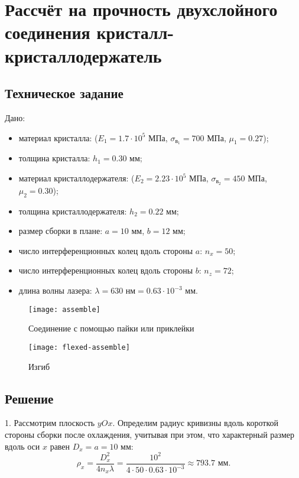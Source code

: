\chapter{Рассчёт на прочность двухслойного соединения кристалл-кристаллодержатель}

\section{Техническое задание}

Дано: 
\begin{itemize}
    \item материал кристалла:
         ($E_1 = 1.7 \cdot 10^5 \text{ МПа}$, $\sigma_{в_1} = 700 \text{ МПа}$, $\mu_1 = 0.27$);
    \item толщина кристалла:
        $h_1 = 0.30 \text{ мм}$;
    \item материал кристаллодержателя:
         ($E_2 = 2.23 \cdot 10^5 \text{ МПа}$, $\sigma_{в_2} = 450 \text{ МПа}$, $\mu_2 = 0.30$);
    \item толщина кристаллодержателя:
        $h_2 = 0.22 \text{ мм}$;
    \item размер сборки в плане:
        $a = 10 \text{ мм}$, $b = 12 \text{ мм}$;
    \item число интерференционных колец вдоль стороны $a$:
        $n_x = 50$;
    \item число интерференционных колец вдоль стороны $b$:
        $n_z = 72$;
    \item длина волны лазера:
        $\lambda = 630 \text{ нм} = 0.63 \cdot 10^{-3} \text{ мм}$.
\end{itemize}

\begin{figure}[h]
    \centering
    \texttt{[image: assemble]}
    \caption{Соединение с помощью пайки или приклейки}
\end{figure}

\begin{figure}[h]
    \centering
    \texttt{[image: flexed-assemble]}
    \caption{Изгиб}
\end{figure}

\section{Решение}

1. Рассмотрим плоскость $yOx$. Определим радиус кривизны вдоль короткой стороны сборки после охлаждения, учитывая при этом, что характерный размер вдоль оси $x$ равен $D_x = a = 10 \text{ мм}$:
\[
    \rho_x = \frac{D_x^2}{4 n_x \lambda} = \frac{10^2}{4 \cdot 50 \cdot 0.63 \cdot 10^{-3}} \approx 793.7 \text{ мм}.
\]


